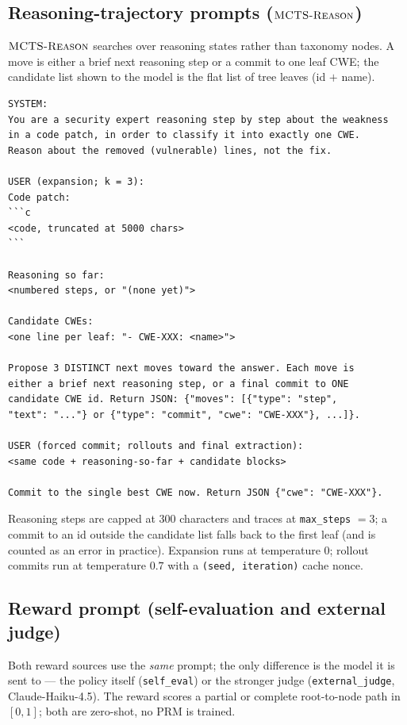 \subsection{Reasoning-trajectory prompts ($\textsc{MCTS-Reason}$)}
\label{app:reason}

$\textsc{MCTS-Reason}$ searches over reasoning states rather than taxonomy nodes. A move is
either a brief next reasoning step or a commit to one leaf CWE; the candidate
list shown to the model is the flat list of tree leaves (id $+$ name).

\begin{lstlisting}
SYSTEM:
You are a security expert reasoning step by step about the weakness
in a code patch, in order to classify it into exactly one CWE.
Reason about the removed (vulnerable) lines, not the fix.

USER (expansion; k = 3):
Code patch:
```c
<code, truncated at 5000 chars>
```

Reasoning so far:
<numbered steps, or "(none yet)">

Candidate CWEs:
<one line per leaf: "- CWE-XXX: <name>">

Propose 3 DISTINCT next moves toward the answer. Each move is
either a brief next reasoning step, or a final commit to ONE
candidate CWE id. Return JSON: {"moves": [{"type": "step",
"text": "..."} or {"type": "commit", "cwe": "CWE-XXX"}, ...]}.

USER (forced commit; rollouts and final extraction):
<same code + reasoning-so-far + candidate blocks>

Commit to the single best CWE now. Return JSON {"cwe": "CWE-XXX"}.
\end{lstlisting}

Reasoning steps are capped at 300 characters and traces at
\texttt{max\_steps} $= 3$; a commit to an id outside the candidate list falls
back to the first leaf (and is counted as an error in practice). Expansion runs
at temperature $0$; rollout commits run at temperature $0.7$ with a
\texttt{(seed, iteration)} cache nonce.

\subsection{Reward prompt (self-evaluation and external judge)}
\label{app:reward}

Both reward sources use the \emph{same} prompt; the only difference is the model
it is sent to --- the policy itself (\texttt{self\_eval}) or the stronger judge
(\texttt{external\_judge}, Claude-Haiku-4.5). The reward scores a partial or
complete root-to-node path in $[0,1]$; both are zero-shot, no PRM is trained.


